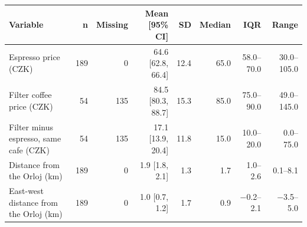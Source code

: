 \begin{tabular}{lrrrrrrr}
\toprule
Variable & n & Missing & Mean [95\% CI] & SD & Median & IQR & Range \\
\midrule
Espresso price (CZK) & 189 &   0 & 64.6 [62.8, 66.4] & 12.4 & 65.0 & 58.0--70.0 & 30.0--105.0 \\
Filter coffee price (CZK) &  54 & 135 & 84.5 [80.3, 88.7] & 15.3 & 85.0 & 75.0--90.0 & 49.0--145.0 \\
Filter minus espresso, same cafe (CZK) &  54 & 135 & 17.1 [13.9, 20.4] & 11.8 & 15.0 & 10.0--20.0 & 0.0--75.0 \\
Distance from the Orloj (km) & 189 &   0 & 1.9 [1.8, 2.1] & 1.3 & 1.7 & 1.0--2.6 & 0.1--8.1 \\
East-west distance from the Orloj (km) & 189 &   0 & 1.0 [0.7, 1.2] & 1.7 & 0.9 & \ensuremath{-}0.2--2.1 & \ensuremath{-}3.5--5.0 \\
\bottomrule
\end{tabular}
